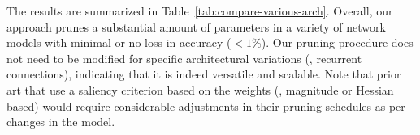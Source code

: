 The results are summarized in Table~\ref{tab:compare-various-arch}.
Overall, our approach prunes a substantial amount of parameters in a variety of network models with minimal or no loss in accuracy ({\small $<1$\%}).
Our pruning procedure does not need to be modified for specific architectural variations (\eg, recurrent connections), indicating that it is indeed versatile and scalable.
Note that prior art that use a saliency criterion based on the weights (\ie, magnitude or Hessian based) would require considerable adjustments in their pruning schedules as per changes in the model.


